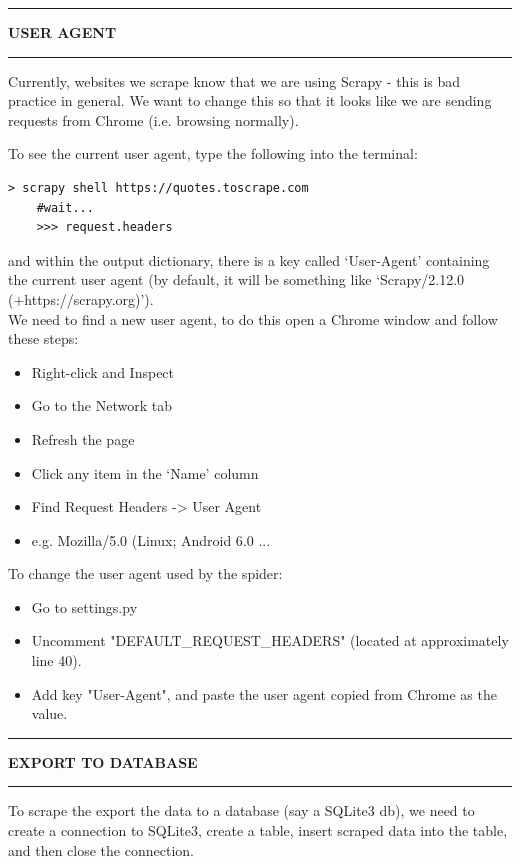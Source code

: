 \documentclass[8pt]{extarticle}
\newcommand{\heading}[1]{%
    \noindent
    \rule{\linewidth}{0.4pt}
    \begin{center}
        \vspace{-1ex}
        \textbf{#1}        
        \vspace{-2.5ex}
    \end{center}
    \rule{\linewidth}{0.4pt}
}
\begin{document}
\begin{multicols}{3}
\heading{USER AGENT}

Currently, websites we scrape know that we are using Scrapy - this is bad practice in general. We want to change this so that it looks like we are sending requests from Chrome (i.e. browsing normally).

To see the current user agent, type the following into the terminal:

\begin{lstlisting}[style=python]     
    > scrapy shell https://quotes.toscrape.com
    #wait...
    >>> request.headers
\end{lstlisting}
and within the output dictionary, there is a key called `User-Agent' containing the current user agent (by default, it will be something like `Scrapy/2.12.0 (+https://scrapy.org)').\\

We need to find a new user agent, to do this open a Chrome window and follow these steps:

\begin{itemize}
    \item Right-click and Inspect 
    \item Go to the Network tab
    \item Refresh the page
    \item Click any item in the `Name' column
    \item Find Request Headers -> User Agent
    \item e.g. Mozilla/5.0 (Linux; Android 6.0 ...
\end{itemize}

To change the user agent used by the spider:

\begin{itemize}
    \item Go to settings.py
    \item Uncomment "DEFAULT\_REQUEST\_HEADERS" (located at approximately line 40). 
    \item Add key "User-Agent", and paste the user agent copied from Chrome as the value.
\end{itemize}

\heading{EXPORT TO DATABASE}

To scrape the export the data to a database (say a SQLite3 db), we need to create a connection to SQLite3, create a table, insert scraped data into the table, and then close the connection. \\


\end{multicols}
\end{document}
